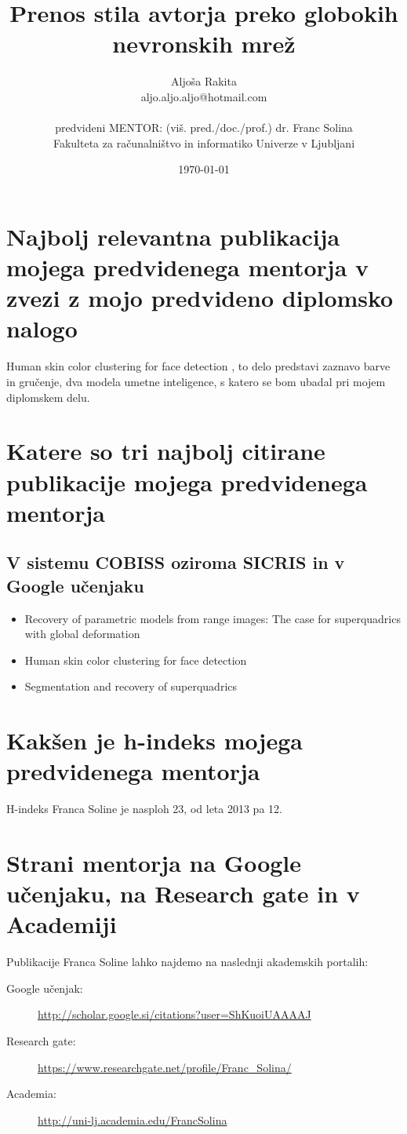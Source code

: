 \documentclass[11pt,a4paper]{article}
\title{Prenos stila avtorja preko globokih nevronskih mrež}
\author{Aljoša Rakita\\
aljo.aljo.aljo@hotmail.com\\
\ \\
predvideni MENTOR: (viš. pred./doc./prof.) dr. Franc Solina \\
Fakulteta za računalništvo in informatiko Univerze v Ljubljani
\date{\today}         
}
\begin{document}
\maketitle

\section{Najbolj relevantna publikacija mojega predvidenega mentorja v zvezi z mojo predvideno diplomsko nalogo}

Human skin color clustering for face detection \cite{kovac2003human}, to delo predstavi zaznavo barve in gručenje, dva modela umetne inteligence, s katero se bom ubadal pri mojem diplomskem delu.


\section{Katere so tri najbolj citirane publikacije mojega predvidenega mentorja}

\subsection{V sistemu COBISS oziroma SICRIS in v Google učenjaku}


\begin{itemize}
  \item Recovery of parametric models from range images: The case for superquadrics with global deformation\cite{solina1990recovery}
  \item Human skin color clustering for face detection \cite{kovac2003human}
\item Segmentation and recovery of superquadrics \cite{jaklic2013segmentation}
\end{itemize}

\section{Kakšen je h-indeks mojega predvidenega mentorja}

H-indeks Franca Soline je nasploh 23, od leta 2013 pa 12.


\section{Strani mentorja na Google učenjaku, na Research gate in v  Academiji}

Publikacije Franca Soline lahko najdemo na naslednji akademskih portalih:
\begin{description}
\item[Google učenjak:] \url{http://scholar.google.si/citations?user=ShKuoiUAAAAJ}

\item[Research gate:] \url{https://www.researchgate.net/profile/Franc_Solina/}

\item[Academia:] \url{http://uni-lj.academia.edu/FrancSolina}

\end{description}



\end{document}
